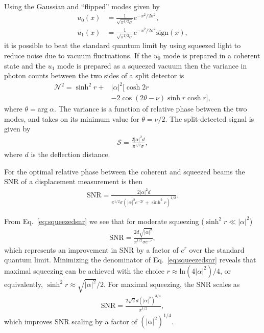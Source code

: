 Using the Gaussian and ``flipped'' modes given by
\begin{align}
\nonumber u_0(x) &= \frac{1}{\sqrt{\pi^{1/2}\sigma}}e^{-x^2/2\sigma^2},\\
u_1(x) &= \frac{1}{\sqrt{\pi^{1/2}\sigma}}e^{-x^2/2\sigma^2}\text{sign}(x),
\end{align}
it is possible to beat the standard quantum limit by using squeezed light to reduce noise due to vacuum fluctuations.  If the $u_0$ mode is prepared in a coherent state and the $u_1$ mode is prepared as a squeezed vacuum then the variance in photon counts between the two sides of a split detector is 
\begin{align}\label{eq:generalvariance}
\nonumber\mathcal{N}^2 = \sinh^2 r +& |\alpha |^2[\cosh 2r \\
&- 2\cos(2\theta - \nu)\sinh r \cosh r ],
\end{align}
where $\theta = \text{arg}\; \alpha$.  The variance is a function of relative phase between the two modes, and takes on its minimum value for $\theta = \nu/2$.  The split-detected signal is given by 
\begin{align}
\mathcal{S} = \frac{2|\alpha|^2 d}{\pi^{1/2}\sigma},
\end{align}
where $d$ is the deflection distance.

For the optimal relative phase between the coherent and squeezed beams the SNR of a displacement measurement is then
\begin{align}\label{eq:squeezedsnr}
\text{SNR} = \frac{2|\alpha |^2 d}{\pi^{1/2}\sigma (|\alpha |^2 e^{-2r} + \sinh^2 r)^{1/2}}.
\end{align}  


From Eq.~\eqref{eq:squeezedsnr} we see that for moderate squeezing ($\sinh^2 r \ll |\alpha |^2$) 
\begin{align}
\text{SNR} = \frac{2d\sqrt{|\alpha |^2} }{\pi^{1/2}\sigma e^{-r}},
\end{align}
which represents an improvement in SNR by a factor of $e^r$ over the standard quantum limit.  Minimizing the denominator of Eq.~\eqref{eq:squeezedsnr} reveals that maximal squeezing can be achieved with the choice $r \approx \text{ln}(4|\alpha |^2)/4$, or equivalently, $\sinh^2 r \approx \sqrt{|\alpha |^2}/2$. For maximal squeezing, the SNR scales as 
\begin{align}
\text{SNR} = \frac{2\sqrt{2}d(|\alpha |^2)^{3/4} }{\pi^{1/2}},
\end{align}
which improves SNR scaling by a factor of $(|\alpha |^2)^{1/4}$.
